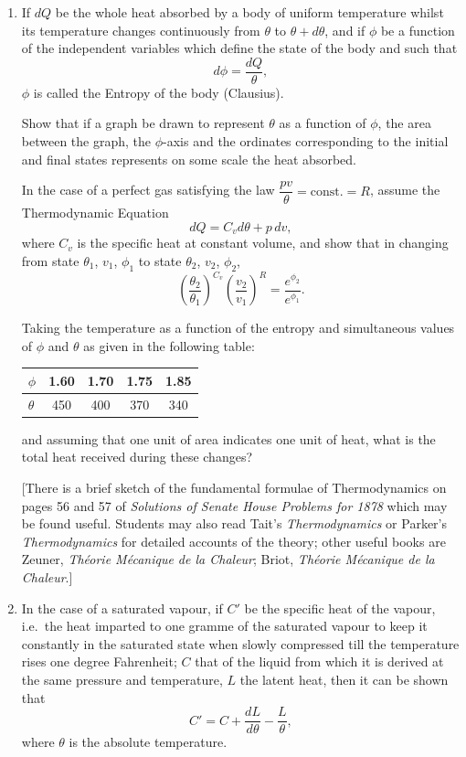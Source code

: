 \documentclass[11pt, a4paper]{article}
\begin{document}
\begin{enumerate}[leftmargin=2em]
\item If $dQ$ be the whole heat absorbed by a body of uniform temperature whilst its temperature changes continuously from $\theta$ to $\theta+d\theta$, and if $\phi$ be a function of the independent variables which define the state of the body and such that
\[
d\phi = \dfrac{dQ}{\theta},
\]
$\phi$ is called the Entropy of the body (Clausius).

Show that if a graph be drawn to represent $\theta$ as a function of $\phi$, the area between the graph, the $\phi$-axis and the ordinates corresponding to the initial and final states represents on some scale the heat absorbed.

In the case of a perfect gas satisfying the law $\dfrac{pv}{\theta}=\text{const.}=R$, assume the Thermodynamic Equation
\[
dQ = C_v d\theta + p\, dv,
\]
where $C_v$ is the specific heat at constant volume, and show that in changing from state $\theta_1$, $v_1$, $\phi_1$ to state $\theta_2$, $v_2$, $\phi_2$,
\[
\left(\dfrac{\theta_2}{\theta_1}\right)^{C_v}\left(\dfrac{v_2}{v_1}\right)^R = \dfrac{e^{\phi_2}}{e^{\phi_1}}.
\]

Taking the temperature as a function of the entropy and simultaneous values of $\phi$ and $\theta$ as given in the following table:

\begin{center}
\begin{tabular}{@{}l|cccc@{}}
\toprule
$\phi$ & 1.60 & 1.70 & 1.75 & 1.85 \\
\midrule
$\theta$ & 450 & 400 & 370 & 340 \\
\bottomrule
\end{tabular}
\end{center}

and assuming that one unit of area indicates one unit of heat, what is the total heat received during these changes?

[There is a brief sketch of the fundamental formulae of Thermodynamics on pages 56 and 57 of \textit{Solutions of Senate House Problems for 1878} which may be found useful. Students may also read Tait's \textit{Thermodynamics} or Parker's \textit{Thermodynamics} for detailed accounts of the theory; other useful books are Zeuner, \textit{Th\'eorie M\'ecanique de la Chaleur}; Briot, \textit{Th\'eorie M\'ecanique de la Chaleur}.]

\item In the case of a saturated vapour, if $C'$ be the specific heat of the vapour, i.e.\ the heat imparted to one gramme of the saturated vapour to keep it constantly in the saturated state when slowly compressed till the temperature rises one degree Fahrenheit; $C$ that of the liquid from which it is derived at the same pressure and temperature, $L$ the latent heat, then it can be shown that
\[
C' = C+\dfrac{dL}{d\theta}-\dfrac{L}{\theta},
\]
where $\theta$ is the absolute temperature.


\end{enumerate}
\end{document}
